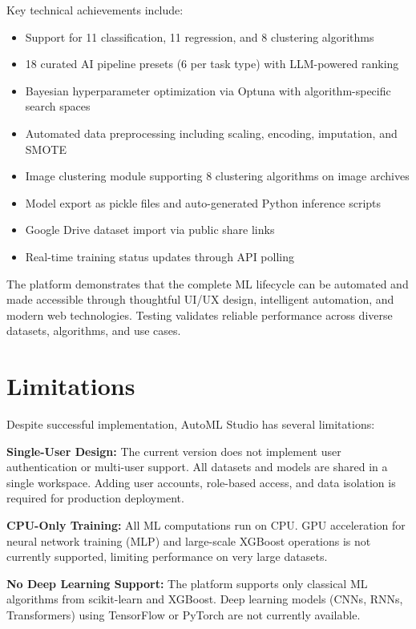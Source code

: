 \documentclass[12pt,a4paper]{report}
\begin{document}
Key technical achievements include:
\begin{itemize}
    \item Support for 11 classification, 11 regression, and 8 clustering algorithms
    \item 18 curated AI pipeline presets (6 per task type) with LLM-powered ranking
    \item Bayesian hyperparameter optimization via Optuna with algorithm-specific search spaces
    \item Automated data preprocessing including scaling, encoding, imputation, and SMOTE
    \item Image clustering module supporting 8 clustering algorithms on image archives
    \item Model export as pickle files and auto-generated Python inference scripts
    \item Google Drive dataset import via public share links
    \item Real-time training status updates through API polling
\end{itemize}

The platform demonstrates that the complete ML lifecycle can be automated and made accessible through thoughtful UI/UX design, intelligent automation, and modern web technologies. Testing validates reliable performance across diverse datasets, algorithms, and use cases.

\section{Limitations}

Despite successful implementation, AutoML Studio has several limitations:

\textbf{Single-User Design:}
The current version does not implement user authentication or multi-user support. All datasets and models are shared in a single workspace. Adding user accounts, role-based access, and data isolation is required for production deployment.

\vspace{0.3cm}

\textbf{CPU-Only Training:}
All ML computations run on CPU. GPU acceleration for neural network training (MLP) and large-scale XGBoost operations is not currently supported, limiting performance on very large datasets.

\vspace{0.3cm}

\textbf{No Deep Learning Support:}
The platform supports only classical ML algorithms from scikit-learn and XGBoost. Deep learning models (CNNs, RNNs, Transformers) using TensorFlow or PyTorch are not currently available.
\end{document}

